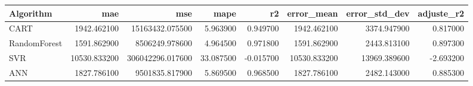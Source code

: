 \begin{tabular}{lrrrrrrr}
\toprule
Algorithm & mae & mse & mape & r2 & error_mean & error_std_dev & adjuste_r2 \\
\midrule
CART & 1942.462100 & 15163432.075500 & 5.963900 & 0.949700 & 1942.462100 & 3374.947900 & 0.817000 \\
RandomForest & 1591.862900 & 8506249.978600 & 4.964500 & 0.971800 & 1591.862900 & 2443.813100 & 0.897300 \\
SVR & 10530.833200 & 306042296.017600 & 33.087500 & -0.015700 & 10530.833200 & 13969.389600 & -2.693200 \\
ANN & 1827.786100 & 9501835.817900 & 5.869500 & 0.968500 & 1827.786100 & 2482.143000 & 0.885300 \\
\bottomrule
\end{tabular}
